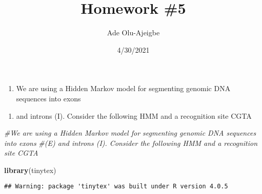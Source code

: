 \documentclass[
]{article}
\title{Homework \#5}
\author{Ade Olu-Ajeigbe}
\date{4/30/2021}
\newenvironment{Shaded}{\begin{snugshade}}{\end{snugshade}}
\newcommand{\CommentTok}[1]{\textcolor[rgb]{0.56,0.35,0.01}{\textit{#1}}}
\newcommand{\KeywordTok}[1]{\textcolor[rgb]{0.13,0.29,0.53}{\textbf{#1}}}
\newcommand{\NormalTok}[1]{#1}
\providecommand{\tightlist}{%
  \setlength{\itemsep}{0pt}\setlength{\parskip}{0pt}}
\begin{document}
\maketitle

\begin{enumerate}
\def\labelenumi{\arabic{enumi}.}
\tightlist
\item
  We are using a Hidden Markov model for segmenting genomic DNA
  sequences into exons
\end{enumerate}

\begin{enumerate}
\def\labelenumi{(\Alph{enumi})}
\setcounter{enumi}{4}
\tightlist
\item
  and introns (I). Consider the following HMM and a recognition site
  CGTA
\end{enumerate}

\begin{Shaded}
\begin{Highlighting}[]
\CommentTok{#We are using a Hidden Markov model for segmenting genomic DNA sequences into exons}
\CommentTok{#(E) and introns (I). Consider the following HMM and a recognition site CGTA}

\KeywordTok{library}\NormalTok{(tinytex)}
\end{Highlighting}
\end{Shaded}

\begin{verbatim}
## Warning: package 'tinytex' was built under R version 4.0.5
\end{verbatim}
\end{document}
